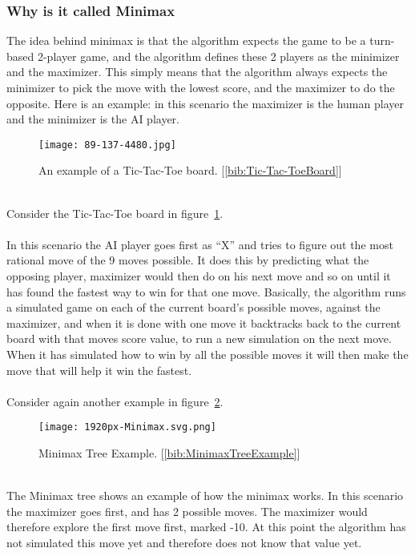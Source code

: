 \subsubsection{Why is it called Minimax}
The idea behind minimax is that the algorithm expects the game to be a turn-based 2-player game, and the algorithm defines these 2 players as the minimizer and the maximizer. 
This simply means that the algorithm always expects the minimizer to pick the move with the lowest score, and the maximizer to do the opposite. 
Here is an example: in this scenario the maximizer is the human player and the minimizer is the AI player.\\
\begin{figure}
    \caption{An example of a Tic-Tac-Toe board. [\ref{bib:Tic-Tac-ToeBoard}]}
    \texttt{[image: 89-137-4480.jpg]}
    \label{fig:Board Example}
\end{figure}\\
Consider the Tic-Tac-Toe board in figure~\ref{fig:Board Example}.\\\\
In this scenario the AI player goes first as “X” and tries to figure out the most rational move of the 9 moves possible. 
It does this by predicting what the opposing player, maximizer would then do on his next move and so on until it has found the fastest way to win for that one move. 
Basically, the algorithm runs a simulated game on each of the current board’s possible moves, against the maximizer, 
and when it is done with one move it backtracks back to the current board with that moves score value, to run a new simulation on the next move. 
When it has simulated how to win by all the possible moves it will then make the move that will help it win the fastest.\\\\
Consider again another example in figure~\ref{fig:Tree Example}.\\
\begin{figure}
    \caption{Minimax Tree Example. [\ref{bib:MinimaxTreeExample}]}
    \texttt{[image: 1920px-Minimax.svg.png]}
    \label{fig:Tree Example}
\end{figure}\\
The Minimax tree shows an example of how the minimax works. In this scenario the maximizer goes first, and has 2 possible moves. 
The maximizer would therefore explore the first move first, marked -10. At this point the algorithm has not simulated this move yet and therefore does not know that value yet. 
